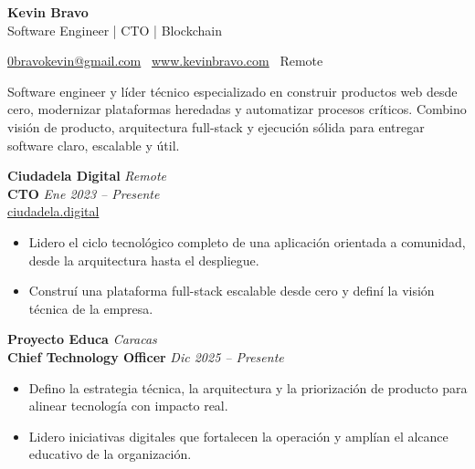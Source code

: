 \documentclass[10pt]{article}
\newcommand{\sectiontitle}[1]{%
    \par\vspace{5pt}%
    \noindent\makebox[\linewidth][c]{\textbf{#1}}\par
    \vspace{2pt}%
}
\begin{document}
\small

\begin{center}
    \textbf{Kevin Bravo}\\
    Software Engineer | CTO | Blockchain \\
    \hrulefill
\end{center}

\begin{center}
    \href{mailto:0bravokevin@gmail.com}{0bravokevin@gmail.com} \textbullet \ \href{http://www.kevinbravo.com}{www.kevinbravo.com} \textbullet \ Remote
\end{center}

\vspace{1pt}

\sectiontitle{Perfil}

Software engineer y líder técnico especializado en construir productos web desde cero, modernizar plataformas heredadas y automatizar procesos críticos. Combino visión de producto, arquitectura full-stack y ejecución sólida para entregar software claro, escalable y útil.

\sectiontitle{Experiencia}

\textbf{Ciudadela Digital} \hfill \textit{Remote} \\
\textbf{CTO} \hfill \textit{Ene 2023 – Presente} \\
\href{https://ciudadela.digital/}{ciudadela.digital}
\begin{itemize}
    \item Lidero el ciclo tecnológico completo de una aplicación orientada a comunidad, desde la arquitectura hasta el despliegue.
    \item Construí una plataforma full-stack escalable desde cero y definí la visión técnica de la empresa.
\end{itemize}

\vspace{3pt}

\textbf{Proyecto Educa} \hfill \textit{Caracas} \\
\textbf{Chief Technology Officer} \hfill \textit{Dic 2025 – Presente}
\begin{itemize}
    \item Defino la estrategia técnica, la arquitectura y la priorización de producto para alinear tecnología con impacto real.
    \item Lidero iniciativas digitales que fortalecen la operación y amplían el alcance educativo de la organización.
\end{itemize}
\end{document}
